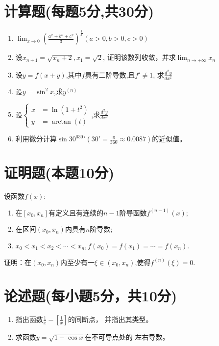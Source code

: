 \documentclass[a4paper,12pt]{article}
\begin{document}
\begin{spacing}{2.0}
    \section{计算题(每题5分,共30分)}
    \begin{enumerate}
        \item $\displaystyle\lim_{x\rightarrow 0}\left(\frac{a^x+b^x+c^x}{3}\right)^\frac{1}{x}(a>0,b>0,c>0)$ 
            \vskip 4cm
        \item 设$\displaystyle x_{n+1} = \sqrt{x_n+2}, x_1=\sqrt{2}$, 
            证明该数列收敛，并求$\displaystyle \lim_{n\rightarrow +\infty}x_n$ \vskip 4cm
        \item 设$\displaystyle y=f(x+y)$,其中$f$具有二阶导数,且$f'\neq 1$, 
            求$\displaystyle \frac{d^2y}{dx^2}$ \vskip 5cm
        \item 设$\displaystyle y=\sin^2x$,求$y^{(n)}$ \vskip 5cm
        \item 设$\displaystyle \left\{ \begin{array}{rcl} x & = \ln(1+t^2) \\ y & = \arctan(t) \end{array} \right.$,求$\displaystyle \frac{d^2 y}{dx^2}$ \vskip 5cm \newpage
        \item 利用微分计算$\displaystyle \sin 30^030'  (30'=\frac{\pi}{360}\approx 0.0087)$的近似值。
    \end{enumerate}\vskip 5cm

    \section{证明题(本题10分)}
    设函数$f(x)$:
    \begin{enumerate}
        \item 在$\left[x_0, x_n\right]$有定义且有连续的$n-1$阶导函数$f^{(n-1)}(x)$;
        \item 在区间$(x_0,x_n)$内具有$n$阶导数;
        \item $\displaystyle x_0<x_1<x_2<\cdots<x_n,f(x_0)=f(x_1)=\cdots=f(x_n)$.
    \end{enumerate}
    证明：在$(x_0,x_n)$内至少有一$\xi \in (x_0,x_n)$,使得$f^{(n)}(\xi)=0.$\vskip 5cm

    \section{论述题(每小题5分，共10分)}
        \begin{enumerate}
            \item 指出函数$\displaystyle \frac{1}{x} - \left[\frac{1}{x}\right]$的间断点，
                并指出其类型。\vskip 7cm
            \item 求函数$\displaystyle y = \sqrt{1 - \cos x}$在不可导点处的
                左右导数。
        \end{enumerate}\newpage



\end{spacing}
\end{document}
